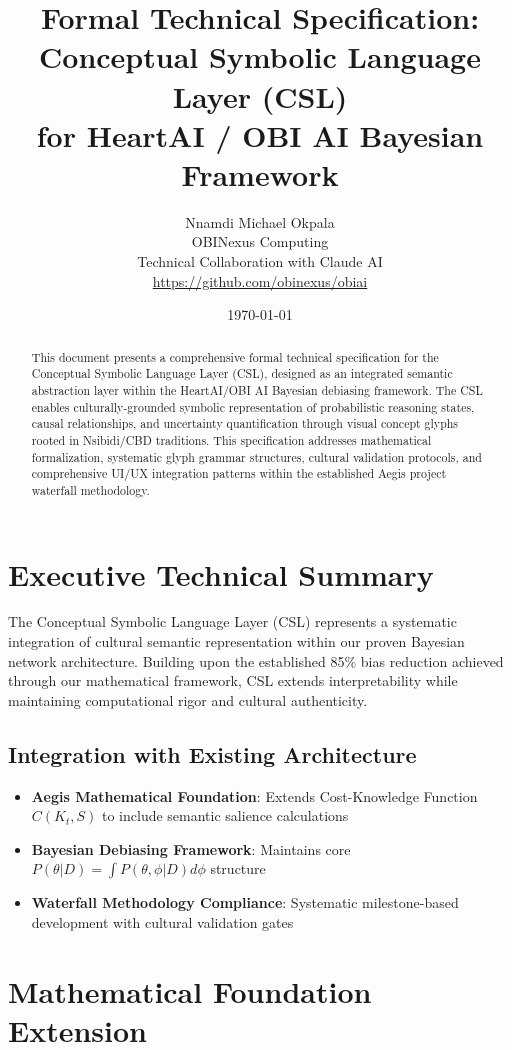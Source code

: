 \documentclass[12pt]{article}
\title{Formal Technical Specification:\\
Conceptual Symbolic Language Layer (CSL)\\
for HeartAI / OBI AI Bayesian Framework}
\author{Nnamdi Michael Okpala \\ 
OBINexus Computing \\
Technical Collaboration with Claude AI \\
\url{https://github.com/obinexus/obiai}}
\date{\today}
\begin{document}
\maketitle

\begin{abstract}
This document presents a comprehensive formal technical specification for the Conceptual Symbolic Language Layer (CSL), designed as an integrated semantic abstraction layer within the HeartAI/OBI AI Bayesian debiasing framework. The CSL enables culturally-grounded symbolic representation of probabilistic reasoning states, causal relationships, and uncertainty quantification through visual concept glyphs rooted in Nsibidi/CBD traditions. This specification addresses mathematical formalization, systematic glyph grammar structures, cultural validation protocols, and comprehensive UI/UX integration patterns within the established Aegis project waterfall methodology.
\end{abstract}

\tableofcontents
\newpage

\section{Executive Technical Summary}

The Conceptual Symbolic Language Layer (CSL) represents a systematic integration of cultural semantic representation within our proven Bayesian network architecture. Building upon the established 85\% bias reduction achieved through our mathematical framework, CSL extends interpretability while maintaining computational rigor and cultural authenticity.

\subsection{Integration with Existing Architecture}
\begin{itemize}
    \item \textbf{Aegis Mathematical Foundation}: Extends Cost-Knowledge Function $C(K_t, S)$ to include semantic salience calculations
    \item \textbf{Bayesian Debiasing Framework}: Maintains core $P(\theta|D) = \int P(\theta, \phi|D) d\phi$ structure
    \item \textbf{Waterfall Methodology Compliance}: Systematic milestone-based development with cultural validation gates
\end{itemize}

\section{Mathematical Foundation Extension}
\end{document}

